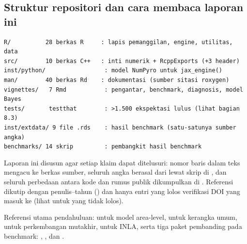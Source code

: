 \subsection{Struktur repositori dan cara membaca laporan ini}

\begin{lstlisting}[language={},caption={Struktur repositori (pilihan relevan).}]
R/          28 berkas R     : lapis pemanggilan, engine, utilitas, data
src/        10 berkas C++   : inti numerik + RcppExports (+3 header)
inst/python/                 : model NumPyro untuk jax_engine()
man/        40 berkas Rd    : dokumentasi (sumber sitasi roxygen)
vignettes/   7 Rmd           : pengantar, benchmark, diagnosis, model Bayes
tests/       testthat        : >1.500 ekspektasi lulus (lihat bagian 8.3)
inst/extdata/ 9 file .rds    : hasil benchmark (satu-satunya sumber angka)
benchmarks/ 14 skrip         : pembangkit hasil benchmark
\end{lstlisting}

Laporan ini disusun agar setiap klaim dapat ditelusuri: nomor baris dalam teks
mengacu ke berkas sumber, seluruh angka berasal dari 
lewat skrip di , dan seluruh perbedaan antara kode dan rumus
publik dikumpulkan di . Referensi dikutip dengan
penulis--tahun () dan hanya entri yang lolos verifikasi DOI yang
masuk ke  (lihat  untuk yang
tidak lolos).

Referensi utama pendahuluan: \citet{fay1979small} untuk model area-level,
\citet{rao2015small} untuk kerangka umum, \citet{pfeffermann2013new} untuk
perkembangan mutakhir, \citet{rue2009approximate} untuk INLA, serta tiga
paket pembanding pada benchmark: 
\citep{molina2015sae},  \citep{kreutzmann2019emdi}, dan
 \citep{denicolo2024tipsae}.
